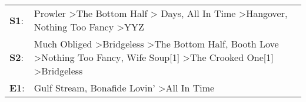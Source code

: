 \begin{supertabular}{p{0.03\textwidth}p{0.92\textwidth}}
 \textbf{S1}:  &                                                                               Prowler\textsuperscript{} \textgreater \enspace The Bottom Half\textsuperscript{} \textgreater {} Days\textsuperscript{}, \enspace All In Time\textsuperscript{} \textgreater \enspace Hangover\textsuperscript{}, \enspace Nothing Too Fancy\textsuperscript{} \textgreater \enspace YYZ\textsuperscript{}  \enspace  \\
 \textbf{S2}:  &  Much Obliged\textsuperscript{} \textgreater \enspace Bridgeless\textsuperscript{} \textgreater \enspace The Bottom Half\textsuperscript{}, \enspace Booth Love\textsuperscript{} \textgreater \enspace Nothing Too Fancy\textsuperscript{}, \enspace Wife Soup[1]\textsuperscript{} \textgreater \enspace The Crooked One[1]\textsuperscript{} \textgreater \enspace Bridgeless\textsuperscript{}  \enspace  \\
 \textbf{E1}:  &                                                                                                                                                                                                                                                                      Gulf Stream\textsuperscript{}, \enspace Bonafide Lovin'\textsuperscript{} \textgreater \enspace All In Time\textsuperscript{}  \enspace  \\
\end{supertabular}
